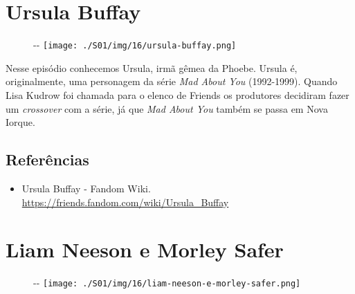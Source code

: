 \hypertarget{ursula-buffay}{%
\section{Ursula Buffay}\label{ursula-buffay}}

\begin{figure}[!ht]
  \begin{adjustwidth}{-\oddsidemargin-1in}{-\rightmargin}
    \centering
    \texttt{[image: ./S01/img/16/ursula-buffay.png]}
  \end{adjustwidth}
\end{figure}

Nesse episódio conhecemos Ursula, irmã gêmea da Phoebe. Ursula é,
originalmente, uma personagem da série \emph{Mad About You} (1992-1999).
Quando Lisa Kudrow foi chamada para o elenco de Friends os produtores
decidiram fazer um \emph{crossover} com a série, já que \emph{Mad About
You} também se passa em Nova Iorque.

\hypertarget{referuxeancias}{%
\subsection{Referências}\label{referuxeancias}}

\begin{itemize}
\tightlist
\item
  \sloppy Ursula Buffay - Fandom Wiki. \url{https://friends.fandom.com/wiki/Ursula_Buffay}
\end{itemize}

\hypertarget{liam-neeson-e-morley-safer}{%
\section{Liam Neeson e Morley Safer}\label{liam-neeson-e-morley-safer}}

\begin{figure}[!ht]
  \begin{adjustwidth}{-\oddsidemargin-1in}{-\rightmargin}
    \centering
    \texttt{[image: ./S01/img/16/liam-neeson-e-morley-safer.png]}
  \end{adjustwidth}
\end{figure}

